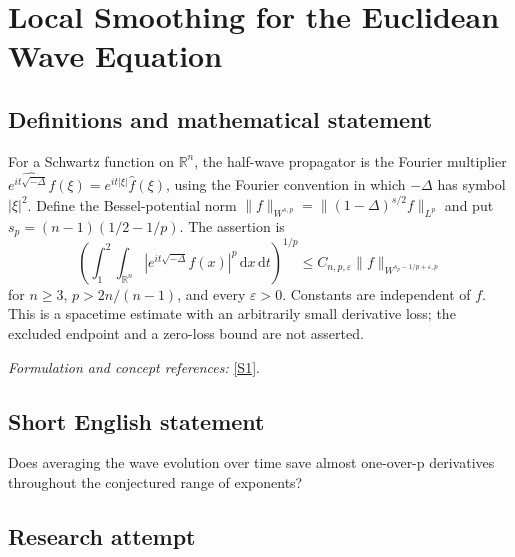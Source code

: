 \documentclass[11pt]{article}
\newcommand{\R}{\mathbb{R}}
\newcommand{\eps}{\varepsilon}
\newcommand{\dd}{\,\mathrm d}
\newcommand{\sref}[2]{\hyperlink{source:#1:#2}{[S#2]}}
\newif\ifshowcatalogue
\newcommand{\cataloguescope}[1]{\ifshowcatalogue
	\paragraph{Exact scope in the supplied catalogue.}
	\begin{quote}\small #1\end{quote}\fi}
\begin{document}
\setcounter{section}{0}
	\clearpage
\section*{\texorpdfstring{Local Smoothing for the Euclidean Wave Equation}{Local Smoothing for the Euclidean Wave Equation}}\label{30004844}
	\subsection{Definitions and mathematical statement}
	For a Schwartz function on $\R^n$, the half-wave propagator is the Fourier multiplier
	$\widehat{e^{it\sqrt{-\Delta}}f}(\xi)=e^{it|\xi|}\widehat f(\xi)$, using the Fourier convention in which $-\Delta$ has symbol $|\xi|^2$. Define the Bessel-potential norm
	$\|f\|_{W^{s,p}}=\|(1-\Delta)^{s/2}f\|_{L^p}$ and put $s_p=(n-1)(1/2-1/p)$. The assertion is
	\[
	\left(\int_1^2\int_{\R^n}|e^{it\sqrt{-\Delta}}f(x)|^p\dd x\dd t\right)^{1/p}
	\le C_{n,p,\eps}\|f\|_{W^{s_p-1/p+\eps,p}}
	\]
	for $n\ge3$, $p>2n/(n-1)$, and every $\eps>0$. Constants are independent of $f$. This is a spacetime estimate with an arbitrarily small derivative loss; the excluded endpoint and a zero-loss bound are not asserted.
	\par\smallskip\textit{Formulation and concept references:} \sref{30004844}{1}.
	\cataloguescope{For every n >= 3, p > 2n/(n-1), and epsilon > 0, prove ||exp(it sqrt(-Delta))f||\_\{L\textasciicircum{}p(R\textasciicircum{}n x [1,2])\} <= C\_\{p,epsilon\} ||f||\_\{W\textasciicircum{}\{s\_p-1/p+epsilon,p\}(R\textasciicircum{}n)\}, where s\_p=(n-1)(1/2-1/p).}
	\subsection{Short English statement}
	Does averaging the wave evolution over time save almost one-over-p derivatives throughout the conjectured range of exponents?
	\subsection{Research attempt}
	
\end{document}

